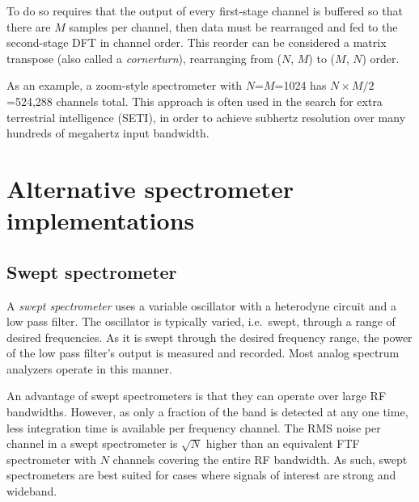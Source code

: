 \documentclass{ws-rv961x669}
\begin{document}
To do so requires that the output of every first-stage channel is buffered so that there are $M$ samples per channel, then data must be rearranged and fed to the second-stage DFT in channel order. This reorder can be considered a matrix transpose (also called a \emph{cornerturn}), rearranging from ($N$, $M$) to ($M$, $N$) order.

As an example, a zoom-style spectrometer with $N$=$M$=1024 has $N\times M / 2$=524,288 channels total. This approach is often used in the search for extra terrestrial intelligence (SETI)\cite{Siemion2011}, in order to achieve subhertz resolution over many hundreds of megahertz input bandwidth.


\section{Alternative spectrometer implementations}

\subsection{Swept spectrometer}\label{swept-spectrometer}


A \emph{swept spectrometer} uses a variable oscillator with a heterodyne
circuit and a low pass filter. The oscillator is typically varied, i.e.~swept, through a range of desired frequencies. As it is swept through the desired frequency range, the power of the low pass filter's output is measured and recorded. Most analog spectrum analyzers operate in this manner.

An advantage of swept spectrometers is that they can operate over large RF bandwidths. However, as only a fraction of the band is detected at any one time, less integration time is available per frequency channel. 
The RMS noise per channel in a swept spectrometer is $\sqrt{N}$ higher than an equivalent FTF spectrometer with $N$ channels covering the entire RF bandwidth. As such, swept spectrometers are best suited for cases where signals of interest are strong and wideband. 
\end{document}
